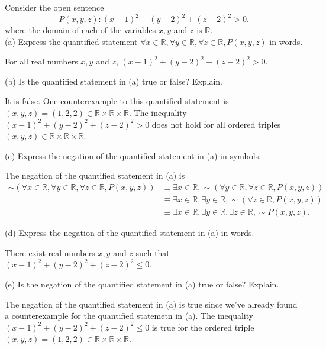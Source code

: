 \documentclass[12pt]{article}
\newenvironment{problem}[2][Problem]{\begin{trivlist}
		\item[\hskip \labelsep {\bfseries #1}\hskip \labelsep {\bfseries #2.}]}{\end{trivlist}}
\newenvironment{solution}[2][Solution]{\begin{trivlist}
		\item[\hskip \labelsep {\bfseries #1}\hskip \labelsep {\bfseries #2.}]}{\end{trivlist}}
\begin{document}
\begin{problem}{74}
	Consider the open sentence
	\begin{equation*}
		P(x,y,z):(x-1)^{2} + (y-2)^{2} + (z-2)^{2} > 0.
	\end{equation*}
	where the domain of each of the variables $x,y$ and $z$ is $\mathbb{R}$.\\
	
	(a) Express the quantified statement $\forall x \in \mathbb{R}, \forall y \in \mathbb{R}, \forall z \in \mathbb{R}, P(x,y,z)$ in words.
	\begin{solution}{a}
		For all real numbers $x,y$ and $z$, $(x-1)^{2} + (y-2)^{2} + (z-2)^{2}>0.$
	\end{solution}

	(b) Is the quantified statement in (a) true or false? Explain.
	\begin{solution}{b}
		It is false. One counterexample to this quantified statement is $(x,y,z) = (1,2,2)\in \mathbb{R}\times\mathbb{R}\times\mathbb{R}$. The inequality $(x-1)^{2} + (y-2)^{2}+(z-2)^{2} > 0$ does not hold for all ordered triples $(x,y,z) \in \mathbb{R}\times\mathbb{R}\times\mathbb{R}$.
	\end{solution}

	(c) Express the negation of the quantified statement in (a) in symbols.
	\begin{solution}{c}
		The negation of the quantified statement in (a) is
		\begin{align*}
			\sim (\forall x \in \mathbb{R}, \forall y \in \mathbb{R}, \forall z \in \mathbb{R}, P(x,y,z)) &\equiv \exists x \in \mathbb{R},\sim(\forall y \in \mathbb{R}, \forall z \in \mathbb{R}, P(x,y,z))\\
			&\equiv \exists x \in \mathbb{R}, \exists y \in \mathbb{R}, \sim( \forall z \in \mathbb{R}, P(x,y,z))\\
			&\equiv \exists x \in \mathbb{R}, \exists y \in \mathbb{R}, \exists z \in \mathbb{R}, \sim P(x,y,z).
		\end{align*}
	\end{solution}

	(d) Express the negation of the quantified statement in (a) in words.
	\begin{solution}{d}
		There exist real numbers $x,y$ and $z$ such that $(x-1)^{2} + (y-2)^{2} + (z-2)^{2}\leq 0$.
	\end{solution}

	(e) Is the negation of the quantified statement in (a) true or false? Explain.
	\begin{solution}{e}
		The negation of the quantified statement in (a) is true since we've already found a counterexample for the quantified statemetn in (a). The inequality $(x-1)^{2} + (y-2)^{2} + (z-2)^{2}\leq 0$ is true for the ordered  triple $(x,y,z) = (1,2,2) \in \mathbb{R}\times \mathbb{R}\times \mathbb{R}$.
	\end{solution}
\end{problem}
\end{document}
